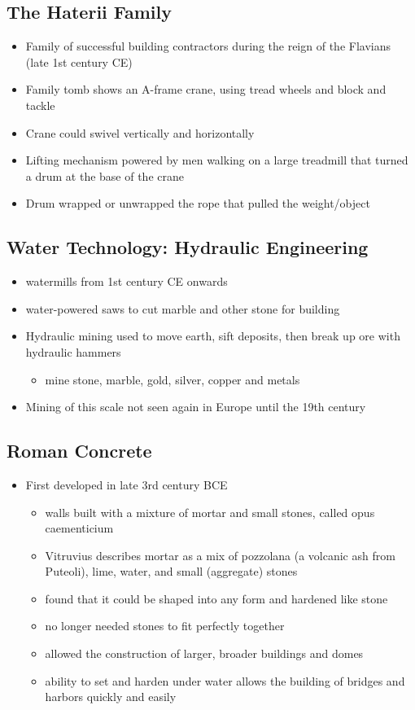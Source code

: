 \documentclass[12pt, twoside]{article}
\begin{document}
\subsection{The Haterii Family}
\begin{itemize}
\item Family of successful building contractors during the reign of the Flavians (late 1st century CE)
\item Family tomb shows an A-frame crane, using tread wheels and block and tackle
\item Crane could swivel vertically and horizontally
\item Lifting mechanism powered by men walking on a large treadmill that turned a drum at the base of the crane
\item Drum wrapped or unwrapped the rope that pulled the weight/object
\end{itemize}

\subsection{Water Technology: Hydraulic Engineering}
\begin{itemize}
\item watermills from 1st century CE onwards
\item water-powered saws to cut marble and other stone for building
\item Hydraulic mining used to move earth, sift deposits, then break up ore with hydraulic hammers
	\begin{itemize}
	\item mine stone, marble, gold, silver, copper and metals
	\end{itemize}
\item Mining of this scale not seen again in Europe until the 19th century
\end{itemize}

\subsection{Roman Concrete}
\begin{itemize}
\item First developed in late 3rd century BCE
	\begin{itemize}
	\item walls built with a mixture of mortar and small stones, called opus caementicium
	\item Vitruvius describes mortar as a mix of pozzolana (a volcanic ash from Puteoli), lime, water, and small (aggregate) stones
	\item found that it could be shaped into any form and hardened like stone
	\item no longer needed stones to fit perfectly together
	\item allowed the construction of larger, broader buildings and domes
	\item ability to set and harden under water allows the building of bridges and harbors quickly and easily
	\end{itemize}
\end{itemize}
\end{document}
